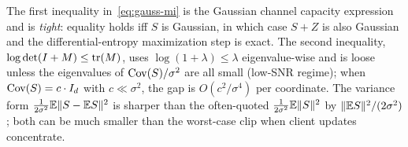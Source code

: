 \begin{remark}\label{rem:variance}
The first inequality in~\eqref{eq:gauss-mi} is the Gaussian channel capacity expression and is \emph{tight}: equality holds iff \(S\) is Gaussian, in which case \(S+Z\) is also Gaussian and the differential-entropy maximization step is exact. The second inequality, \(\log\det(I+M)\le\operatorname{tr}(M)\), uses \(\log(1+\lambda)\le\lambda\) eigenvalue-wise and is loose unless the eigenvalues of \(\operatorname{Cov}(S)/\sigma^2\) are all small (low-SNR regime); when \(\operatorname{Cov}(S) = c\cdot I_d\) with \(c\ll\sigma^2\), the gap is \(O(c^2/\sigma^4)\) per coordinate. The variance form \(\tfrac{1}{2\sigma^2}\mathbb{E}\|S-\mathbb{E} S\|^2\) is sharper than the often-quoted \(\tfrac{1}{2\sigma^2}\mathbb{E}\|S\|^2\) by \(\|\mathbb{E} S\|^2/(2\sigma^2)\); both can be much smaller than the worst-case clip when client updates concentrate.
\end{remark}
